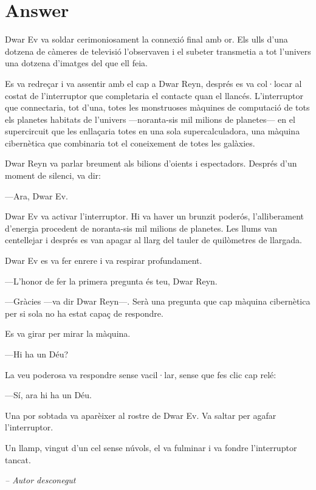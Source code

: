 
\chapter{Answer}




\begin{modernquote}
    Dwar Ev va soldar cerimoniosament la connexió final amb or. Els ulls d’una dotzena de càmeres de televisió l’observaven i el subeter transmetia a tot l’univers una dotzena d’imatges del que ell feia.

Es va redreçar i va assentir amb el cap a Dwar Reyn, després es va col·locar al costat de l’interruptor que completaria el contacte quan el llancés. L’interruptor que connectaria, tot d’una, totes les monstruoses màquines de computació de tots els planetes habitats de l’univers —noranta-sis mil milions de planetes— en el supercircuit que les enllaçaria totes en una sola supercalculadora, una màquina cibernètica que combinaria tot el coneixement de totes les galàxies.

Dwar Reyn va parlar breument als bilions d’oients i espectadors. Després d’un moment de silenci, va dir:

—Ara, Dwar Ev.


Dwar Ev va activar l’interruptor. Hi va haver un brunzit poderós, l’alliberament d’energia procedent de noranta-sis mil milions de planetes. Les llums van centellejar i després es van apagar al llarg del tauler de quilòmetres de llargada.

Dwar Ev es va fer enrere i va respirar profundament.

—L’honor de fer la primera pregunta és teu, Dwar Reyn.



—Gràcies —va dir Dwar Reyn—. Serà una pregunta que cap màquina cibernètica per si sola no ha estat capaç de respondre.


Es va girar per mirar la màquina.

—Hi ha un Déu?


La veu poderosa va respondre sense vacil·lar, sense que fes clic cap relé:

—Sí, ara hi ha un Déu.


Una por sobtada va aparèixer al rostre de Dwar Ev. Va saltar per agafar l’interruptor.

Un llamp, vingut d’un cel sense núvols, el va fulminar i va fondre l’interruptor tancat.


    \hfill\textit{-- Autor desconegut}
\end{modernquote}


